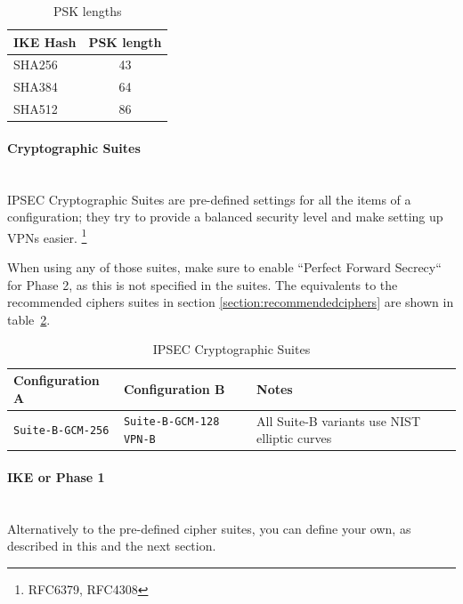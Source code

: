 \begin{table}[h]
  \centering
  \small
  \begin{tabular}{lc}
    \toprule
    IKE Hash & PSK length \\
    \midrule
    SHA256 & 43 \\
    SHA384 & 64 \\
    SHA512 & 86 \\
    \bottomrule
  \end{tabular}
  \caption{PSK lengths}
  \label{tab:IPSEC_psk_len}
\end{table}

\paragraph*{Cryptographic Suites}\mbox{}\\
IPSEC Cryptographic Suites are pre-defined settings for all the items
of a configuration; they try to provide a balanced security level and
make setting up VPNs easier.
\footnote{RFC6379\cite{rfc6379}, RFC4308\cite{rfc4308}}

When using any of those suites, make sure to enable ``Perfect Forward
Secrecy`` for Phase 2, as this is not specified in the suites. The
equivalents to the recommended ciphers suites in section
\ref{section:recommendedciphers} are shown in
table~\ref{tab:IPSEC_suites}.

\begin{table}[h]
  \centering
  \small
  \begin{tabular}{p{2.5cm}p{2.5cm}l}
    \toprule
    Configuration A & Configuration B & Notes\\
    \midrule
    \verb|Suite-B-GCM-256| &
    \verb|Suite-B-GCM-128| \newline
    \verb|VPN-B| 
    & All Suite-B variants use NIST elliptic curves\\
    \bottomrule
  \end{tabular}
  \caption{IPSEC Cryptographic Suites}
  \label{tab:IPSEC_suites}
\end{table}

\paragraph*{IKE or Phase 1}\mbox{}\\

Alternatively to the pre-defined cipher suites, you can define your
own, as described in this and the next section.

